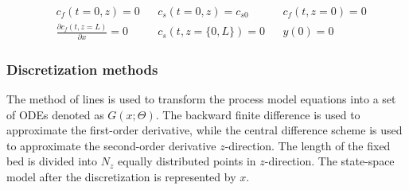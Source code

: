 \documentclass[../Article_Model_Parameters.tex]{subfiles}
\begin{document}
			{\footnotesize
				\begin{align*}
					&c_f(t = 0, z) = 0 && c_s(t = 0, z) = c_{s0} && {c_f}(t, z=0) = 0 \\
					&\frac{\partial c_f(t,z=L)}{\partial x} = 0 && c_s(t, z=\{0,L\}) = 0 && y(0) = 0
			\end{align*} }
			
		\subsubsection{Discretization methods}
		
		The method of lines is used to transform the process model equations into a set of ODEs denoted as $G(x;\Theta)$. The backward finite difference is used to approximate the first-order derivative, while the central difference scheme is used to approximate the second-order derivative $z$-direction. The length of the fixed bed is divided into $N_z$ equally distributed points in $z$-direction. The state-space model after the discretization is represented by $x$.
		
\end{document}
